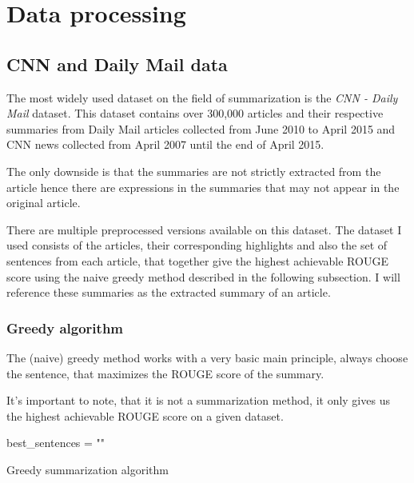 \chapter{Data processing}\label{sect:DataProcessing}
\section{CNN and Daily Mail data}
The most widely used dataset on the field of summarization is the \textit{CNN - Daily Mail} dataset.
This dataset contains over 300,000 articles and their respective summaries from Daily Mail articles collected from June 2010 to April 2015 and CNN news collected from April 2007 until the end of April 2015.~\cite{CNN_DM}

The only downside is that the summaries are not strictly extracted from the article hence there are expressions in the summaries that may not appear in the original article.

There are multiple preprocessed versions available on this dataset. The dataset I used consists of the articles, their corresponding highlights and also the set of sentences from each article, that together give the highest achievable ROUGE score using the naive greedy method described in the following subsection. I will reference these summaries as the extracted summary of an article.

\subsection{Greedy algorithm}
The (naive) greedy method works with a very basic main principle, always choose the sentence, that maximizes the ROUGE score of the summary.

It's important to note, that it is not a summarization method, it only gives us the highest achievable ROUGE score on a given dataset.

\begin{algorithm}
	\SetAlgoLined
	best\_sentences = ""\;
	\caption{Greedy summarization algorithm}
\end{algorithm}

